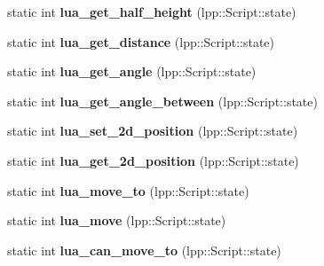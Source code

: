 \begin{DoxyCompactItemize}
\item 
static int {\bfseries lua\+\_\+get\+\_\+half\+\_\+height} (lpp\+::\+Script\+::state)\hypertarget{class_lua_interface_a4f9a1d037368ade8d01d3e75ad6f0a8e}{}\label{class_lua_interface_a4f9a1d037368ade8d01d3e75ad6f0a8e}

\item 
static int {\bfseries lua\+\_\+get\+\_\+distance} (lpp\+::\+Script\+::state)\hypertarget{class_lua_interface_aee8b34891c132406b0084eb46c030fe6}{}\label{class_lua_interface_aee8b34891c132406b0084eb46c030fe6}

\item 
static int {\bfseries lua\+\_\+get\+\_\+angle} (lpp\+::\+Script\+::state)\hypertarget{class_lua_interface_ad43d07ca18cb16adbbf21ef7147287b2}{}\label{class_lua_interface_ad43d07ca18cb16adbbf21ef7147287b2}

\item 
static int {\bfseries lua\+\_\+get\+\_\+angle\+\_\+between} (lpp\+::\+Script\+::state)\hypertarget{class_lua_interface_a0beafae08167a8f52334b3e15e2b6a3d}{}\label{class_lua_interface_a0beafae08167a8f52334b3e15e2b6a3d}

\item 
static int {\bfseries lua\+\_\+set\+\_\+2d\+\_\+position} (lpp\+::\+Script\+::state)\hypertarget{class_lua_interface_a555f3f8a2d56a74cec828b2055898ccd}{}\label{class_lua_interface_a555f3f8a2d56a74cec828b2055898ccd}

\item 
static int {\bfseries lua\+\_\+get\+\_\+2d\+\_\+position} (lpp\+::\+Script\+::state)\hypertarget{class_lua_interface_a6e41d032effbd554d64414d3dd7e2144}{}\label{class_lua_interface_a6e41d032effbd554d64414d3dd7e2144}

\item 
static int {\bfseries lua\+\_\+move\+\_\+to} (lpp\+::\+Script\+::state)\hypertarget{class_lua_interface_a416cfc49e8fb7b619523e2464b3d2247}{}\label{class_lua_interface_a416cfc49e8fb7b619523e2464b3d2247}

\item 
static int {\bfseries lua\+\_\+move} (lpp\+::\+Script\+::state)\hypertarget{class_lua_interface_aa89c14401cec0c13691a4132a3bc4805}{}\label{class_lua_interface_aa89c14401cec0c13691a4132a3bc4805}

\item 
static int {\bfseries lua\+\_\+can\+\_\+move\+\_\+to} (lpp\+::\+Script\+::state)\hypertarget{class_lua_interface_afe542bef2f9a2cac68331367755c01e9}{}\label{class_lua_interface_afe542bef2f9a2cac68331367755c01e9}


\end{DoxyCompactItemize}
